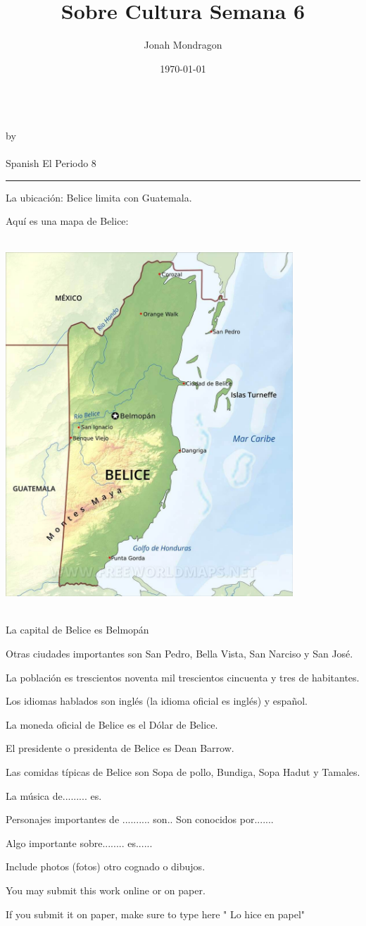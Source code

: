 \documentclass[12pt]{article}
\newcommand{\PutTitle}[1]
{
    \begin{center}
        {\huge\bfseries\thetitle}\\
        by \theauthor\\
        \thedate\\
        #1        
    \end{center}
    \hrule
    \vspace{2ex}
}
\begin{document}
\title{Sobre Cultura Semana 6}
\author{Jonah Mondragon}
\date{\today}
\PutTitle{Spanish El Periodo 8}

\doublespacing

La ubicación: Belice limita con Guatemala.

Aquí es una mapa de Belice:\\
\begin{center}
    \vspace{-4ex}
    \includegraphics[width=4.25in,height=5.5in]{foto_de_Belice.jpg}
\end{center}

La capital de Belice es Belmopán

Otras ciudades importantes son San Pedro, Bella Vista, San Narciso y San José.

La población es trescientos noventa mil trescientos cincuenta y tres de habitantes.

Los idiomas hablados son inglés (la idioma oficial es inglés) y español.

La moneda oficial de Belice es el Dólar de Belice.

El presidente o presidenta de Belice es Dean Barrow.

Las comidas típicas de Belice son Sopa de pollo, Bundiga, Sopa Hadut y Tamales.

La música de......... es. 

Personajes importantes de .......... son..  Son conocidos por.......

Algo importante sobre........ es......

Include photos (fotos) otro cognado o dibujos.  

 

You may submit this work online or on paper. 

If you submit it on paper, make sure to type here " Lo hice en papel"
\end{document}

